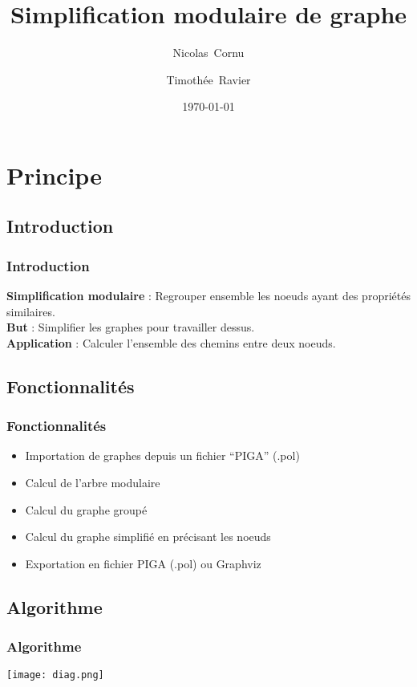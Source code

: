 \documentclass{beamer}
\title{Simplification modulaire de graphe}
\author{Nicolas~Cornu \and Timothée~Ravier}
\institute{ENSI de Bourges}
\date{\today}
\begin{document}
{
	\framenumberoff
	\watermarkoff
	\institute{} %
	\begin{frame}
	\titlepage
	\end{frame}
}


\section{Principe}
\subsection{Introduction}
\begin{frame}
\frametitle{Introduction}
\textbf{Simplification modulaire} : Regrouper ensemble les noeuds ayant des propriétés similaires.\\
\textbf{But} : Simplifier les graphes pour travailler dessus.\\
\textbf{Application} : Calculer l'ensemble des chemins entre deux noeuds.\\
\end{frame}

\subsection{Fonctionnalités}
\begin{frame}
\frametitle{Fonctionnalités}
\begin{itemize}
\item Importation de graphes depuis un fichier ``PIGA'' (.pol)
\item Calcul de l'arbre modulaire
\item Calcul du graphe groupé
\item Calcul du graphe simplifié en précisant les noeuds
\item Exportation en fichier PIGA (.pol) ou Graphviz
\end{itemize}
\end{frame}

\subsection{Algorithme}
\begin{frame}
\frametitle{Algorithme}
\begin{center}
	\texttt{[image: diag.png]}
\end{center}
\end{frame}
\end{document}
